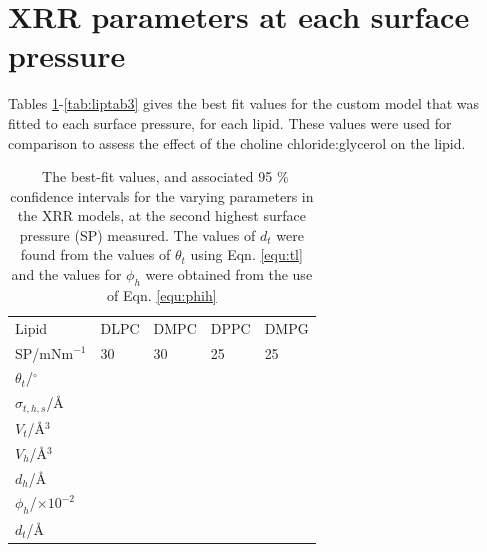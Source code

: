 \documentclass[11pt,a4paper]{article}
\begin{document}
\section{XRR parameters at each surface pressure}
Tables \ref{tab:liptab1}-\ref{tab:liptab3} gives the best fit values for the custom model that was fitted to each surface pressure, for each lipid. These values were used for comparison to assess the effect of the choline chloride:glycerol on the lipid.
%
\begin{table}
  \centering
	\caption{\ The best-fit values, and associated 95 \% confidence intervals for the varying parameters in the XRR models, at the second highest surface pressure (SP) measured. The values of $d_t$ were found from the values of $\theta_t$ using Eqn. \ref{equ:tl} and the values for $\phi_h$ were obtained from the use of Eqn. \ref{equ:phih}}
	\label{tab:liptab1}
	\begin{tabular}{l|l|l|l|l}
		Lipid & DLPC & DMPC & DPPC & DMPG \\
    SP/mNm$^{-1}$ & 30 & 30 & 25 & 25 \\
		\hline
		$\theta_t$/$^\circ$ &  &  &  &  \\
		$\sigma_{t,h,s}$/\AA &  &  &  &  \\
    \hline
    $V_t$/\AA$^3$ &  &  &  &  \\
		$V_h$/\AA$^3$ &  &  &  &  \\
		$d_h$/\AA &  &  &  &  \\
    \hline
    $\phi_h$/$\times10^{-2}$ &  &  &  &  \\
		$d_t$/\AA &  &  &  &  \\
	\end{tabular}
\end{table}
\end{document}
